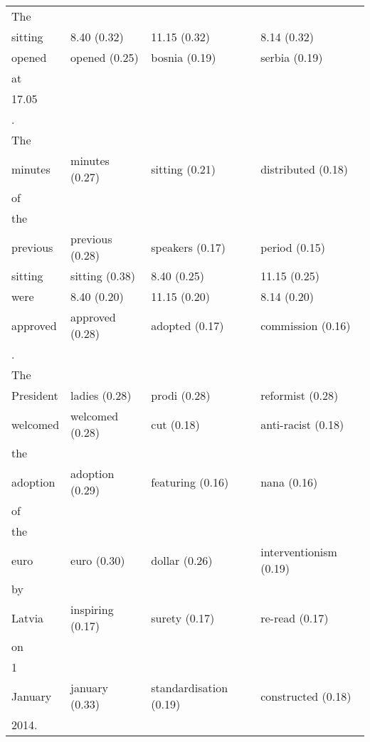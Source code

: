 \documentclass[11pt,twoside,openright]{mpreport}
\begin{document}
\hspace{-0cm}\begin{footnotesize}\begin{tabular}{|llll|}
\hline
The & & & \\
sitting                 & 8.40 (0.32) & 11.15 (0.32) & 8.14 (0.32) \\
opened                  & opened (0.25) & bosnia (0.19) & serbia (0.19) \\
at & & & \\
17.05 & & & \\
. & & & \\
The & & & \\
minutes                 & minutes (0.27) & sitting (0.21) & distributed (0.18) \\
of & & & \\
the & & & \\
previous                & previous (0.28) & speakers (0.17) & period (0.15) \\
sitting                 & sitting (0.38) & 8.40 (0.25) & 11.15 (0.25) \\
were                    & 8.40 (0.20) & 11.15 (0.20) & 8.14 (0.20) \\
approved                & approved (0.28) & adopted (0.17) & commission (0.16) \\
. & & & \\
The & & & \\
President               & ladies (0.28) & prodi (0.28) & reformist (0.28) \\
welcomed                & welcomed (0.28) & cut (0.18) & anti-racist (0.18) \\
the & & & \\
adoption                & adoption (0.29) & featuring (0.16) & nana (0.16) \\
of & & & \\
the & & & \\
euro                    & euro (0.30) & dollar (0.26) & interventionism (0.19) \\
by & & & \\
Latvia                  & inspiring (0.17) & surety (0.17) & re-read (0.17) \\
on & & & \\
1 & & & \\
January                 & january (0.33) & standardisation (0.19) & constructed (0.18) \\
2014. & & & \\
\hline
\end{tabular}\end{footnotesize}\\
\end{document}
